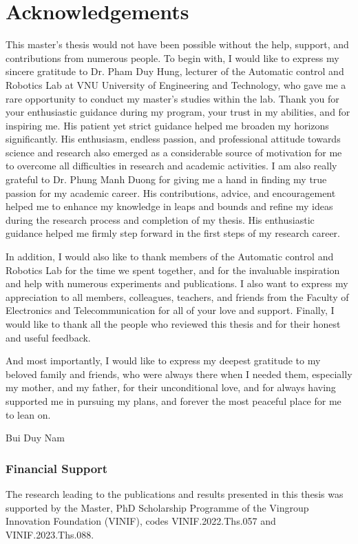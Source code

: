 \chapter*{Acknowledgements}

This master's thesis would not have been possible without the help, support, and contributions from numerous people. To begin with, I would like to express my sincere gratitude to Dr. Pham Duy Hung, lecturer of the Automatic control and Robotics Lab at VNU University of Engineering and Technology, who gave me a rare opportunity to conduct my master's studies within the lab. Thank you for your enthusiastic guidance during my program, your trust in my abilities, and for inspiring me. His patient yet strict guidance helped me broaden my horizons significantly. His enthusiasm, endless passion, and professional attitude towards science and research also emerged as a considerable source of motivation for me to overcome all difficulties in research and academic activities. I am also really grateful to Dr. Phung Manh Duong for giving me a hand in finding my true passion for my academic career. His contributions, advice, and encouragement helped me to enhance my knowledge in leaps and bounds and refine my ideas during the research process and completion of my thesis. His enthusiastic guidance helped me firmly step forward in the first steps of my research career.

In addition, I would also like to thank members of the Automatic control and Robotics Lab for the time we spent together, and for the invaluable inspiration and help with numerous experiments and publications. I also want to express my appreciation to all members, colleagues, teachers, and friends from the Faculty of Electronics and Telecommunication for all of your love and support. Finally, I would like to thank all the people who reviewed this thesis and for their honest and useful feedback.

And most importantly, I would like to express my deepest gratitude to my beloved family and friends, who were always there when I needed them, especially my mother, and my father, for their unconditional love, and for always having supported me in pursuing my plans, and forever the most peaceful place for me to lean on.

\vspace{0.5cm}
\begin{flushleft}
Bui Duy Nam
\end{flushleft}

\subsection*{Financial Support}
The research leading to the publications and results presented in this thesis was supported by the Master, PhD Scholarship Programme of the Vingroup Innovation Foundation (VINIF), codes VINIF.2022.Ths.057 and VINIF.2023.Ths.088.